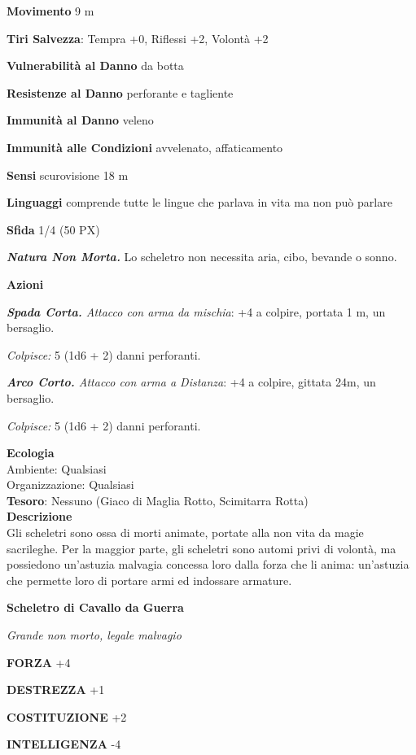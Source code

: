 \begin{multicols}{2}
	\textbf{Movimento} 9 m

	\textbf{Tiri Salvezza}: Tempra +0, Riflessi +2, Volontà +2

	\textbf{Vulnerabilità al Danno} da botta

	\textbf{Resistenze al Danno} perforante e tagliente

	\textbf{Immunità al Danno} veleno

	\textbf{Immunità alle Condizioni} avvelenato, affaticamento

	\textbf{Sensi} scurovisione 18 m

	\textbf{Linguaggi} comprende tutte le lingue che parlava in vita ma non può parlare

	\textbf{Sfida} 1/4 (50 PX)

	\textit{\textbf{Natura Non Morta.}} Lo scheletro non necessita aria, cibo, bevande o sonno.

	\textbf{Azioni}

	\textit{\textbf{Spada Corta.} Attacco con arma da mischia}: +4 a colpire, portata 1 m, un bersaglio.

	\textit{Colpisce:} 5 (1d6 + 2) danni perforanti.

	\textit{\textbf{Arco Corto.} Attacco con arma a Distanza}: +4 a colpire, gittata 24m, un bersaglio.

	\textit{Colpisce:} 5 (1d6 + 2) danni perforanti.

	\textbf{Ecologia}\\
	Ambiente: Qualsiasi\\
	Organizzazione: Qualsiasi\\
	\textbf{Tesoro}: Nessuno (Giaco di Maglia Rotto, Scimitarra Rotta)\\
	\textbf{Descrizione}\\
	Gli scheletri sono ossa di morti animate, portate alla non vita da magie sacrileghe. Per la maggior parte, gli scheletri sono automi privi di volontà, ma possiedono un'astuzia malvagia concessa loro dalla forza che li anima: un'astuzia che permette loro di portare armi ed indossare armature.

	\medskip{}\textbf{Scheletro di Cavallo da Guerra}

	\textit{Grande non morto, legale malvagio}

	\textbf{FORZA} +4

	\textbf{DESTREZZA} +1

	\textbf{COSTITUZIONE} +2

	\textbf{INTELLIGENZA} -4


\end{multicols}
